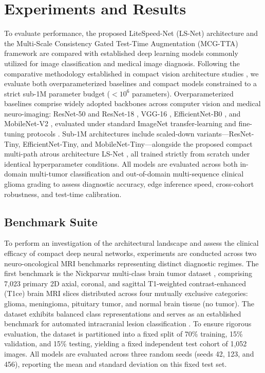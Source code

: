 ﻿\documentclass[journal]{IEEEtran}
\begin{document}
\section{Experiments and Results}

To evaluate performance, the proposed LiteSpeed-Net (LS-Net) architecture and the Multi-Scale Consistency Gated Test-Time Augmentation (MCG-TTA) framework are compared with established deep learning models commonly utilized for image classification and medical image diagnosis. Following the comparative methodology established in compact vision architecture studies \cite{21}, we evaluate both overparameterized baselines and compact models constrained to a strict sub-1M parameter budget ($<10^6$ parameters). Overparameterized baselines comprise widely adopted backbones across computer vision and medical neuro-imaging: ResNet-50 and ResNet-18 \cite{14}, VGG-16 \cite{39}, EfficientNet-B0 \cite{40}, and MobileNet-V2 \cite{37}, evaluated under standard ImageNet transfer-learning and fine-tuning protocols \cite{10, 54, 55}. Sub-1M architectures include scaled-down variants---ResNet-Tiny, EfficientNet-Tiny, and MobileNet-Tiny---alongside the proposed compact multi-path atrous architecture LS-Net \cite{21}, all trained strictly from scratch under identical hyperparameter conditions. All models are evaluated across both in-domain multi-tumor classification and out-of-domain multi-sequence clinical glioma grading to assess diagnostic accuracy, edge inference speed, cross-cohort robustness, and test-time calibration.

\subsection{Benchmark Suite}

To perform an investigation of the architectural landscape and assess the clinical efficacy of compact deep neural networks, experiments are conducted across two neuro-oncological MRI benchmarks representing distinct diagnostic regimes. The first benchmark is the Nickparvar multi-class brain tumor dataset \cite{34}, comprising 7,023 primary 2D axial, coronal, and sagittal T1-weighted contrast-enhanced (T1ce) brain MRI slices distributed across four mutually exclusive categories: glioma, meningioma, pituitary tumor, and normal brain tissue (no tumor). The dataset exhibits balanced class representations and serves as an established benchmark for automated intracranial lesion classification \cite{34, 55}. To ensure rigorous evaluation, the dataset is partitioned into a fixed split of 70\% training, 15\% validation, and 15\% testing, yielding a fixed independent test cohort of 1,052 images. All models are evaluated across three random seeds (seeds 42, 123, and 456), reporting the mean and standard deviation on this fixed test set.
\end{document}
